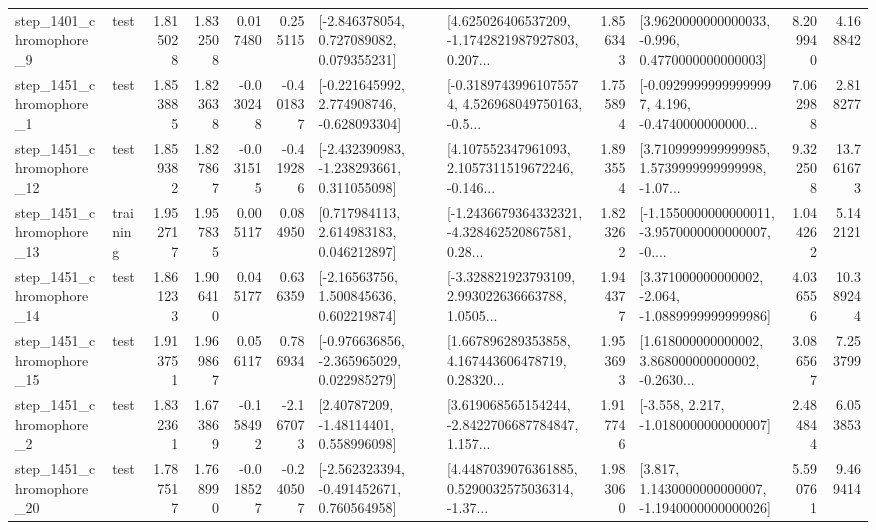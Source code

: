 \begin{tabular}{llrrrrllrlrr}
  step\_1401\_chromophore\_9 &      test &      1.815028 &    1.832508 &      0.017480 &  0.255115 &    [-2.846378054, 0.727089082, 0.079355231] &  [4.625026406537209, -1.1742821987927803, 0.207... &       1.856343 &   [3.9620000000000033, -0.996, 0.4770000000000003] &            8.209940 &          4.168842 \\
  step\_1451\_chromophore\_1 &      test &      1.853885 &    1.823638 &     -0.030248 & -0.401837 &   [-0.221645992, 2.774908746, -0.628093304] &  [-0.31897439961075574, 4.526968049750163, -0.5... &       1.755894 &  [-0.09299999999999997, 4.196, -0.4740000000000... &            7.062988 &          2.818277 \\
 step\_1451\_chromophore\_12 &      test &      1.859382 &    1.827867 &     -0.031515 & -0.419286 &   [-2.432390983, -1.238293661, 0.311055098] &  [4.107552347961093, 2.1057311519672246, -0.146... &       1.893554 &  [3.7109999999999985, 1.5739999999999998, -1.07... &            9.322508 &         13.761673 \\
 step\_1451\_chromophore\_13 &  training &      1.952717 &    1.957835 &      0.005117 &  0.084950 &     [0.717984113, 2.614983183, 0.046212897] &  [-1.2436679364332321, -4.328462520867581, 0.28... &       1.823262 &  [-1.1550000000000011, -3.9570000000000007, -0.... &            1.044262 &          5.142121 \\
 step\_1451\_chromophore\_14 &      test &      1.861233 &    1.906410 &      0.045177 &  0.636359 &     [-2.16563756, 1.500845636, 0.602219874] &  [-3.328821923793109, 2.993022636663788, 1.0505... &       1.944377 &   [3.371000000000002, -2.064, -1.0889999999999986] &            4.036556 &         10.389244 \\
 step\_1451\_chromophore\_15 &      test &      1.913751 &    1.969867 &      0.056117 &  0.786934 &   [-0.976636856, -2.365965029, 0.022985279] &  [1.667896289353858, 4.167443606478719, 0.28320... &       1.953693 &  [1.618000000000002, 3.868000000000002, -0.2630... &            3.086567 &          7.253799 \\
  step\_1451\_chromophore\_2 &      test &      1.832361 &    1.673869 &     -0.158492 & -2.167073 &      [2.40787209, -1.48114401, 0.558996098] &  [3.619068565154244, -2.8422706687784847, 1.157... &       1.917746 &               [-3.558, 2.217, -1.0180000000000007] &            2.484844 &          6.053853 \\
 step\_1451\_chromophore\_20 &      test &      1.787517 &    1.768990 &     -0.018527 & -0.240507 &   [-2.562323394, -0.491452671, 0.760564958] &  [4.4487039076361885, 0.5290032575036314, -1.37... &       1.983060 &   [3.817, 1.1430000000000007, -1.1940000000000026] &            5.590761 &          9.469414 \\

\end{tabular}
